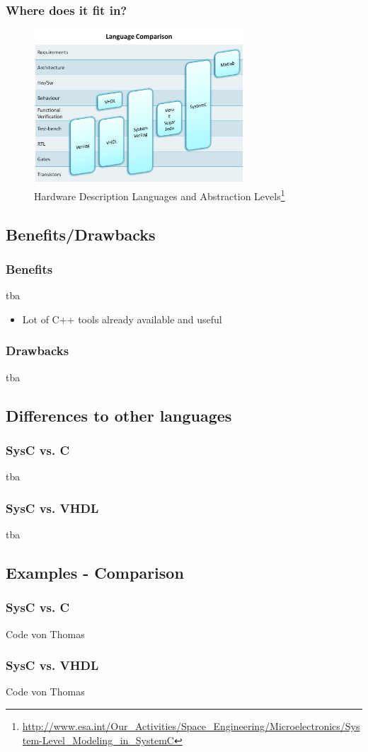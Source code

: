 \documentclass{beamer}
\begin{document}
\begin{frame}\frametitle{Where does it fit in?} 
	    \begin{figure}[hp]
	      \centering
	      \includegraphics[width=0.7\textwidth]{pictures/Hardware_Description_Languages_and_Abstraction_Levels.png}
	      \caption{Hardware Description Languages and Abstraction Levels\footnote[frame]{\url{http://www.esa.int/Our_Activities/Space_Engineering/Microelectronics/System-Level_Modeling_in_SystemC}}}
	      \label{fig:flow}
	    \end{figure} 

\end{frame}

\subsection{Benefits/Drawbacks}
\begin{frame}\frametitle{Benefits} 
tba
\begin{itemize}
	\item Lot of C++ tools already available and useful
\end{itemize}
\end{frame}
\begin{frame}\frametitle{Drawbacks} 
tba
\end{frame}

\subsection{Differences to other languages}
\begin{frame}\frametitle{SysC vs. C} 
tba
\end{frame}
\begin{frame}\frametitle{SysC vs. VHDL} 
tba
\end{frame}

\subsection{Examples - Comparison}
\begin{frame}\frametitle{SysC vs. C} 
Code von Thomas
\end{frame}
\begin{frame}\frametitle{SysC vs. VHDL} 
Code von Thomas
\end{frame}
\end{document}
